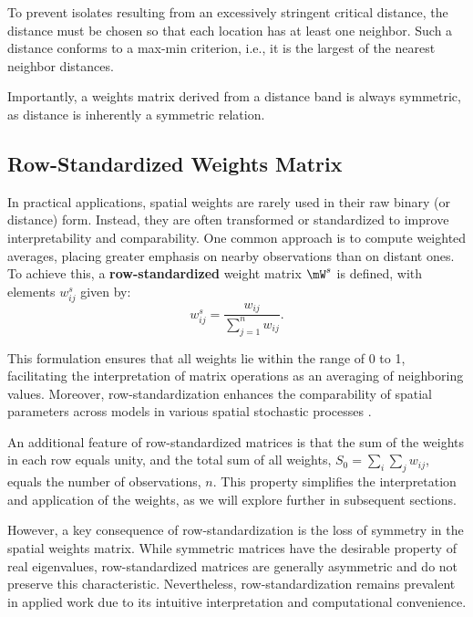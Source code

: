 \documentclass[english,12pt]{book}\usepackage[]{graphicx}\usepackage[]{xcolor}
\begin{document}
To prevent isolates resulting from an excessively stringent critical distance, the distance must be chosen so that each location has at least one neighbor. Such a distance conforms to a max-min criterion, i.e., it is the largest of the nearest neighbor distances.

Importantly, a weights matrix derived from a distance band is always symmetric, as distance is inherently a symmetric relation.

\subsection{Row-Standardized Weights Matrix}

In practical applications, spatial weights are rarely used in their raw binary (or distance) form. Instead, they are often transformed or standardized to improve interpretability and comparability. One common approach is to compute weighted averages, placing greater emphasis on nearby observations than on distant ones. To achieve this, a \textbf{row-standardized} weight matrix $\mW^s$ is defined, with elements $w_{ij}^s$ given by:
\begin{equation*}
w_{ij}^s = \frac{w_{ij}}{\sum_{j = 1}^n w_{ij}}.
\end{equation*}

This formulation ensures that all weights lie within the range of 0 to 1, facilitating the interpretation of matrix operations as an averaging of neighboring values. Moreover, row-standardization enhances the comparability of spatial parameters across models in various spatial stochastic processes \citep{AnselinBera1998}.

An additional feature of row-standardized matrices is that the sum of the weights in each row equals unity, and the total sum of all weights, $S_0 = \sum_i\sum_j w_{ij}$, equals the number of observations, $n$. This property simplifies the interpretation and application of the weights, as we will explore further in subsequent sections.

However, a key consequence of row-standardization is the loss of symmetry in the spatial weights matrix. While symmetric matrices have the desirable property of real eigenvalues, row-standardized matrices are generally asymmetric and do not preserve this characteristic. Nevertheless, row-standardization remains prevalent in applied work due to its intuitive interpretation and computational convenience.
\end{document}
